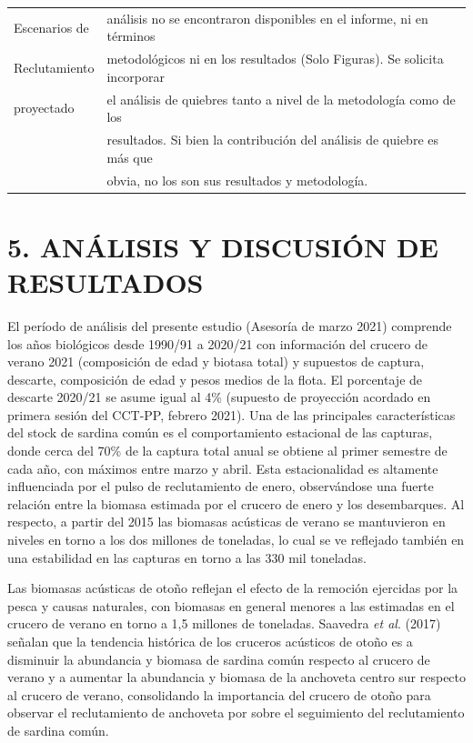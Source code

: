 \documentclass[
  spanish,
]{article}
\begin{document}
\begin{table}[h]
{\begin{tabular}{|l|l|}
  Escenarios de           & análisis no se encontraron disponibles en el informe, ni en términos       \\
  Reclutamiento           & metodológicos ni en los resultados (Solo Figuras). Se solicita incorporar  \\
  proyectado              & el análisis de quiebres tanto a nivel de la metodología como de los        \\
                          & resultados. Si bien la contribución del análisis de quiebre es más que     \\
                          & obvia, no los son sus resultados y metodología.                            \\ \hline
    \end{tabular}}
    \end{table}

\normalsize

\pagebreak

\hypertarget{anuxe1lisis-y-discusiuxf3n-de-resultados}{%
\section{5. ANÁLISIS Y DISCUSIÓN DE
RESULTADOS}\label{anuxe1lisis-y-discusiuxf3n-de-resultados}}

El período de análisis del presente estudio (Asesoría de marzo 2021)
comprende los años biológicos desde 1990/91 a 2020/21 con información
del crucero de verano 2021 (composición de edad y biotasa total) y
supuestos de captura, descarte, composición de edad y pesos medios de la
flota. El porcentaje de descarte 2020/21 se asume igual al 4\% (supuesto
de proyección acordado en primera sesión del CCT-PP, febrero 2021). Una
de las principales características del stock de sardina común es el
comportamiento estacional de las capturas, donde cerca del 70\% de la
captura total anual se obtiene al primer semestre de cada año, con
máximos entre marzo y abril. Esta estacionalidad es altamente
influenciada por el pulso de reclutamiento de enero, observándose una
fuerte relación entre la biomasa estimada por el crucero de enero y los
desembarques. Al respecto, a partir del 2015 las biomasas acústicas de
verano se mantuvieron en niveles en torno a los dos millones de
toneladas, lo cual se ve reflejado también en una estabilidad en las
capturas en torno a las 330 mil toneladas.

Las biomasas acústicas de otoño reflejan el efecto de la remoción
ejercidas por la pesca y causas naturales, con biomasas en general
menores a las estimadas en el crucero de verano en torno a 1,5 millones
de toneladas. Saavedra \emph{et al}. (2017) señalan que la tendencia
histórica de los cruceros acústicos de otoño es a disminuir la
abundancia y biomasa de sardina común respecto al crucero de verano y a
aumentar la abundancia y biomasa de la anchoveta centro sur respecto al
crucero de verano, consolidando la importancia del crucero de otoño para
observar el reclutamiento de anchoveta por sobre el seguimiento del
reclutamiento de sardina común.
\end{document}
